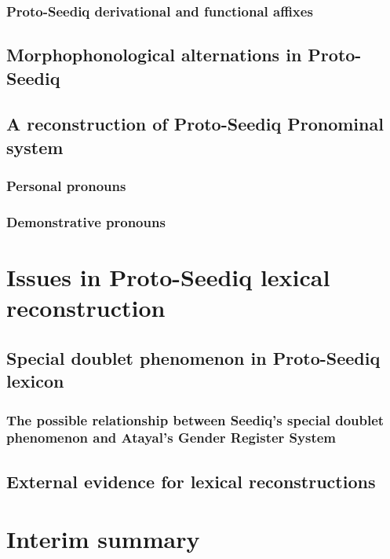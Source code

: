 \subsubsection{Proto-Seediq derivational and functional affixes}

\subsection{Morphophonological alternations in Proto-Seediq}

\subsection{A reconstruction of Proto-Seediq Pronominal system}

\subsubsection{Personal pronouns}

\subsubsection{Demonstrative pronouns}

\section{Issues in Proto-Seediq lexical reconstruction}

\subsection{Special doublet phenomenon in Proto-Seediq lexicon}

\subsubsection{The possible relationship between Seediq's special doublet phenomenon and Atayal's Gender Register System}

\subsection{External evidence for lexical reconstructions}

\section{Interim summary}
\lipsum[1]